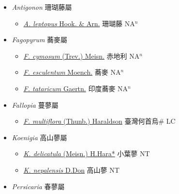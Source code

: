 
  \begin{itemize}
 \item[] \textit{Antigonon} 珊瑚藤屬
                    
  \begin{itemize}
        \item[] \href{http://www.theplantlist.org/tpl1.1/search?q=Antigonon+leptopus}{\textit{A. leptopus} Hook. \& Arn.}   珊瑚藤 NA$^n$
  \end{itemize}
 \item[] \textit{Fagopyrum} 蕎麥屬
                    
  \begin{itemize}
        \item[] \href{http://www.theplantlist.org/tpl1.1/search?q=Fagopyrum+cymosum}{\textit{F. cymosum} (Trev.) Meisn.}   赤地利 NA$^n$
        \item[] \href{http://www.theplantlist.org/tpl1.1/search?q=Fagopyrum+esculentum}{\textit{F. esculentum} Moench.}   蕎麥 NA$^n$
        \item[] \href{http://www.theplantlist.org/tpl1.1/search?q=Fagopyrum+tataricum}{\textit{F. tataricum} Gaertn.}   印度蕎麥 NA$^n$
  \end{itemize}
 \item[] \textit{Fallopia} 蔓蓼屬
                    
  \begin{itemize}
        \item[] \href{http://www.theplantlist.org/tpl1.1/search?q=Fallopia+multiflora}{\textit{F. multiflora} (Thunb.) Haraldson}     臺灣何首烏\# LC
  \end{itemize}
 \item[] \textit{Koenigia} 高山蓼屬
                    
  \begin{itemize}
        \item[] \href{http://www.theplantlist.org/tpl1.1/search?q=Koenigia+delicatula}{\textit{K. delicatula} (Meisn.) H.Hara*}   小葉蓼 NT
        \item[] \href{http://www.theplantlist.org/tpl1.1/search?q=Koenigia+nepalensis}{\textit{K. nepalensis} D.Don}     高山蓼 NT
  \end{itemize}
 \item[] \textit{Persicaria} 春蓼屬
                    

\end{itemize}
